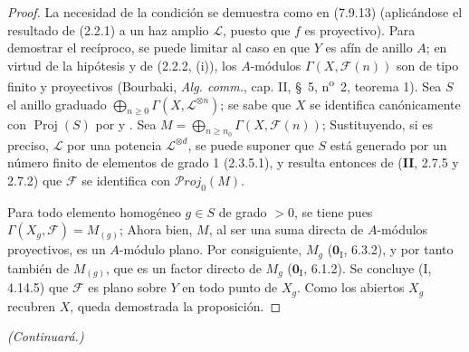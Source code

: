 \begin{proof}
La necesidad de la condición se demuestra como en (7.9.13) (aplicándose el resultado de
(2.2.1) a un haz amplio $\mathscr L$, puesto que $f$ es
proyectivo). Para demostrar el recíproco, se puede limitar al caso en que $Y$ es
afín de anillo $A$; en virtud de la hipótesis y de (2.2.2, (i)), los
$A$-módulos
$\Gamma(X,\mathscr F(n))$ son de tipo finito y proyectivos (Bourbaki,
\emph{Alg. comm.}, cap. II, \S~5, n\textsuperscript{o}~2, teorema 1). Sea $S$
el anillo graduado $\bigoplus_{n\geq0}\Gamma(X,\mathscr L^{\otimes n})$;
se sabe que $X$ se identifica
canónicamente con $\operatorname{Proj}(S)$ por
 y . Sea
$M=\bigoplus_{n\geq n_0}\Gamma(X,\mathscr F(n))$;
Sustituyendo, si es preciso, $\mathscr L$ por una potencia
$\mathscr L^{\otimes d}$, se puede suponer que $S$ está generado por un número finito de elementos de grado 1
(2.3.5.1), y resulta entonces de (\textbf{II}, 2.7.5 y 2.7.2) que $\mathscr F$ se
identifica con $\mathscr P\!roj_0(M)$.

Para todo elemento homogéneo $g\in S$ de
grado $>0$, se tiene pues $\Gamma(X_g,\mathscr F)=M_{(g)}$;
Ahora bien, $M$, al ser una suma directa de $A$-módulos
proyectivos, es un $A$-módulo plano. Por consiguiente, $M_g$ ($\mathbf{0}_{\mathrm I}$, 6.3.2), y por tanto también de $M_{(g)}$, que es un
factor directo de $M_g$ ($\mathbf{0}_{\mathrm I}$, 6.1.2). Se concluye (I, 4.14.5) que
$\mathscr F$ es plano sobre $Y$ en todo
punto de $X_g$. Como los abiertos $X_g$ recubren $X$, queda
demostrada la proposición.
\end{proof}

\bigskip
\noindent\emph{(Continuará.)}

\clearpage
{}
